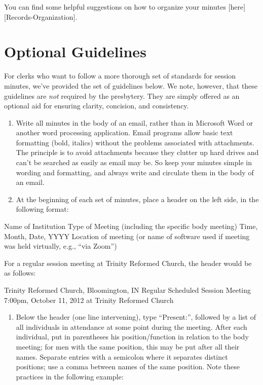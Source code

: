 \documentclass[
]{book}
\providecommand{\tightlist}{%
  \setlength{\itemsep}{0pt}\setlength{\parskip}{0pt}}
\begin{document}
You can find some helpful suggestions on how to organize your minutes {[}here{]}{[}Records-Organization{]}.

\hypertarget{optional-guidelines}{%
\section{Optional Guidelines}\label{optional-guidelines}}

For clerks who want to follow a more thorough set of standards for session minutes, we've provided the set of guidelines below. We note, however, that these guidelines are \emph{not} required by the presbytery. They are simply offered as an optional aid for ensuring clarity, concision, and consistency.

\begin{enumerate}
\def\labelenumi{\arabic{enumi}.}
\item
  Write all minutes in the body of an email, rather than in Microsoft Word or another word processing application. Email programs allow basic text formatting (bold, italics) without the problems associated with attachments. The principle is to avoid attachments because they clutter up hard drives and can't be searched as easily as email may be. So keep your minutes simple in wording and formatting, and always write and circulate them in the body of an email.
\item
  At the beginning of each set of minutes, place a header on the left side, in the following format:
\end{enumerate}

Name of Institution
Type of Meeting (including the specific body meeting)
Time, Month, Date, YYYY
Location of meeting (or name of software used if meeting was held virtually, e.g., ``via Zoom'')

For a regular session meeting at Trinity Reformed Church, the header would be as follows:

Trinity Reformed Church, Bloomington, IN
Regular Scheduled Session Meeting
7:00pm, October 11, 2012
at Trinity Reformed Church

\begin{enumerate}
\def\labelenumi{\arabic{enumi}.}
\setcounter{enumi}{2}
\tightlist
\item
  Below the header (one line intervening), type ``Present:'', followed by a list of all individuals in attendance at some point during the meeting. After each individual, put in parentheses his position/function in relation to the body meeting; for men with the same position, this may be put after all their names. Separate entries with a semicolon where it separates distinct positions; use a comma between names of the same position. Note these practices in the following example:
\end{enumerate}
\end{document}
